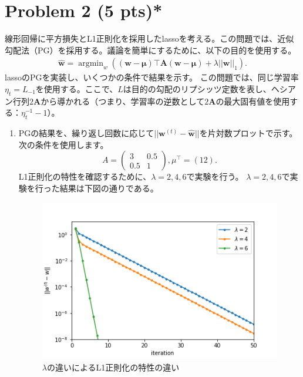 \documentclass{jsarticle}
\DeclareMathOperator*{\argmin}{argmin}
\begin{document}
\section*{Problem 2 (5 pts)*}
線形回帰に平方損失とL1正則化を採用したlassoを考える。この問題では、近似勾配法（PG）を採用する。議論を簡単にするために、以下の目的を使用する。
\begin{align*}
  \hat{\bm w} = \argmin_{w} \left((\bm w-\bm\mu)\top \bm A(\bm w-\bm\mu)+\lambda||\bm w||_1\right).
\end{align*}
lassoのPGを実装し、いくつかの条件で結果を示す。
この問題では、同じ学習率$\eta_t = L_{-1}$を使用する。ここで、$L$は目的の勾配のリプシッツ定数を表し、ヘシアン行列$2\bm A$から導かれる（つまり、学習率の逆数として$2\bm A$の最大固有値を使用する：$\eta_t^{-1}-1$）。
\begin{enumerate}
  \item PGの結果を、繰り返し回数に応じて$||\bm w^{(t)} − \hat{\bm w}||$を片対数プロットで示す。次の条件を使用します。
  $$
  A=\begin{pmatrix}
  3& 0.5 \\
  0.5& 1
  \end{pmatrix}, \mu^\top=(1 2).
  $$
  L1正則化の特性を確認するために、$\lambda = 2, 4, 6$で実験を行う。
  $\lambda = 2, 4, 6$で実験を行った結果は下図の通りである。
  \begin{figure}[htbp]
    \centering
    \includegraphics[width=.7\linewidth]{image/2.png}
    \caption{$\lambda$の違いによるL1正則化の特性の違い}
  \end{figure}
\end{enumerate}
\end{document}
